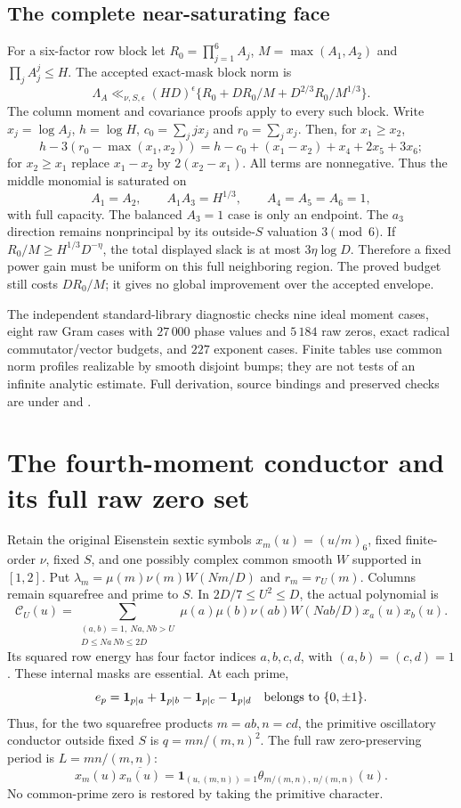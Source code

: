 \documentclass[11pt]{article}
\theoremstyle{definition}\newtheorem{definition}[theorem]{Definition}
\theoremstyle{remark}\newtheorem{remark}[theorem]{Remark}
\begin{document}
\subsection{The complete near-saturating face}
For a six-factor row block let $R_0=\prod_{j=1}^6A_j$,
$M=\max(A_1,A_2)$ and $\prod_j A_j^j\le H$.
The accepted exact-mask block norm is
\[
 \Lambda_A\ll_{\nu,S,\epsilon}(HD)^\epsilon
 \{R_0+DR_0/M+D^{2/3}R_0/M^{1/3}\}.
\]
The column moment and covariance proofs apply to every such block.
Write $x_j=\log A_j$, $h=\log H$, $c_0=\sum_jjx_j$ and
$r_0=\sum_jx_j$. Then, for $x_1\ge x_2$,
\[
 h-3(r_0-\max(x_1,x_2))
 =h-c_0+(x_1-x_2)+x_4+2x_5+3x_6;
\]
for $x_2\ge x_1$ replace $x_1-x_2$ by $2(x_2-x_1)$.
All terms are nonnegative. Thus the middle monomial is saturated on
\[
 A_1=A_2,\qquad A_1A_3=H^{1/3},\qquad A_4=A_5=A_6=1,
\]
with full capacity. The balanced $A_3=1$ case is only an endpoint.
The $a_3$ direction remains nonprincipal by its outside-$S$ valuation
$3\pmod6$. If $R_0/M\ge H^{1/3}D^{-\eta}$, the total displayed slack
is at most $3\eta\log D$. Therefore a fixed power gain must be uniform
on this full neighboring region. The proved budget still costs $DR_0/M$;
it gives no global improvement over the accepted envelope.

The independent standard-library diagnostic checks nine ideal moment
cases, eight raw Gram cases with $27\,000$ phase values and $5\,184$ raw
zeros, exact radical commutator/vector budgets, and $227$ exponent cases.
Finite tables use common norm profiles realizable by smooth disjoint bumps;
they are not tests of an infinite analytic estimate. Full derivation,
source bindings and preserved checks are under
 and
.

\section{The fourth-moment conductor and its full raw zero set}
\label{upq:core}
Retain the original Eisenstein sextic symbols $x_m(u)=(u/m)_6$,
fixed finite-order $\nu$, fixed $S$, and one possibly complex common
smooth $W$ supported in $[1,2]$. Put
$\lambda_m=\mu(m)\nu(m)W(Nm/D)$ and $r_m=r_U(m)$.
Columns remain squarefree and prime to $S$. In $2D/7\le U^2\le D$, the actual polynomial is
\[
 \mathcal C_U(u)=
 \sum_{\substack{(a,b)=1,\ Na,Nb>U\\D\le Na\,Nb\le2D}}
 \mu(a)\mu(b)\nu(ab)W(Nab/D)x_a(u)x_b(u).
\]
Its squared row energy has four factor indices $a,b,c,d$, with
$(a,b)=(c,d)=1$. These internal masks are essential. At each prime,
\[
 e_p=\mathbf1_{p\mid a}+\mathbf1_{p\mid b}
       -\mathbf1_{p\mid c}-\mathbf1_{p\mid d}
 \quad\hbox{belongs to }\{0,\pm1\}.
\]
Thus, for the two squarefree products $m=ab,n=cd$, the primitive
oscillatory conductor outside fixed $S$ is $q=mn/(m,n)^2$.
The full raw zero-preserving period is $L=mn/(m,n)$:
\[
 x_m(u)\overline{x_n(u)}
 =\mathbf1_{(u,(m,n))=1}\theta_{m/(m,n),\,n/(m,n)}(u).
\]
No common-prime zero is restored by taking the primitive character.
\end{document}
